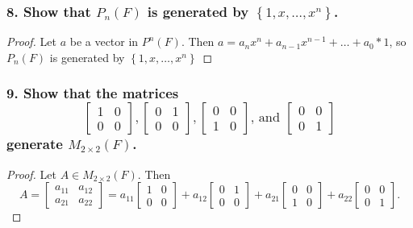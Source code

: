 \documentclass{article}
\begin{document}
\subsubsection*{8. Show that $P_n(F)$ is generated by $\left\{1, x, \dots, x^n\right\}$.}
\begin{proof}
	Let $a$ be a vector in $P^n(F)$. Then $a = a_nx^n + a_{n-1}x^{n-1} + \dots + a_0 * 1$, so $P_n(F)$ is generated by $\left\{1, x, \dots, x^n\right\}$
\end{proof}

\subsubsection*{9. Show that the matrices \[
	\begin{bmatrix}
		1 & 0 \\ 0 & 0
	\end{bmatrix},
	\begin{bmatrix}
		0 & 1 \\ 0 & 0
	\end{bmatrix},
	\begin{bmatrix}
		0 & 0 \\ 1 & 0
	\end{bmatrix}\text{, and }
	\begin{bmatrix}
		0 & 0 \\ 0 & 1
	\end{bmatrix}
\] generate $M_{2 \times 2}(F)$.}
\begin{proof}
	Let $A \in M_{2 \times 2}(F)$. Then
	\[
		A =
		\begin{bmatrix}
			a_{11} & a_{12} \\ a_{21} & a_{22}
		\end{bmatrix} = 
		a_{11}\begin{bmatrix}
			1 & 0 \\ 0 & 0
		\end{bmatrix} + a_{12}\begin{bmatrix}
			0 & 1 \\ 0 & 0
		\end{bmatrix} + a_{21}\begin{bmatrix}
			0 & 0 \\ 1 & 0
		\end{bmatrix} + a_{22}\begin{bmatrix}
			0 & 0 \\ 0 & 1
		\end{bmatrix}.
	\]
\end{proof}
\end{document}

